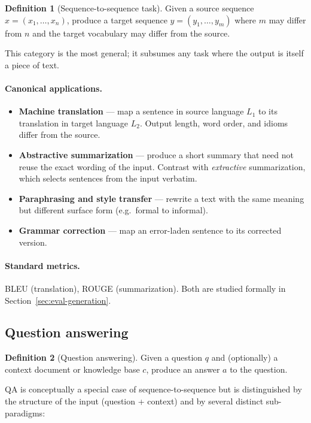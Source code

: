 \documentclass[12pt,a4paper]{report}
\theoremstyle{definition}
\newtheorem{definition}{Definition}[section]
\theoremstyle{remark}
\begin{document}
\begin{definition}[Sequence-to-sequence task]
Given a source sequence $x = (x_1, \dots, x_n)$, produce a target sequence $y = (y_1, \dots, y_m)$ where $m$ may differ from $n$ and the target vocabulary may differ from the source.
\end{definition}

This category is the most general; it subsumes any task where the output is itself a piece of text.

\paragraph{Canonical applications.}
\begin{itemize}
    \item \textbf{Machine translation} --- map a sentence in source language $L_1$ to its translation in target language $L_2$. Output length, word order, and idioms differ from the source.
    \item \textbf{Abstractive summarization} --- produce a short summary that need not reuse the exact wording of the input. Contrast with \emph{extractive} summarization, which selects sentences from the input verbatim.
    \item \textbf{Paraphrasing and style transfer} --- rewrite a text with the same meaning but different surface form (e.g.\ formal to informal).
    \item \textbf{Grammar correction} --- map an error-laden sentence to its corrected version.
\end{itemize}

\paragraph{Standard metrics.} BLEU (translation), ROUGE (summarization). Both are studied formally in Section~\ref{sec:eval-generation}.

\subsection{Question answering}

\begin{definition}[Question answering]
Given a question $q$ and (optionally) a context document or knowledge base $c$, produce an answer $a$ to the question.
\end{definition}

QA is conceptually a special case of sequence-to-sequence but is distinguished by the structure of the input (question + context) and by several distinct sub-paradigms:
\end{document}
